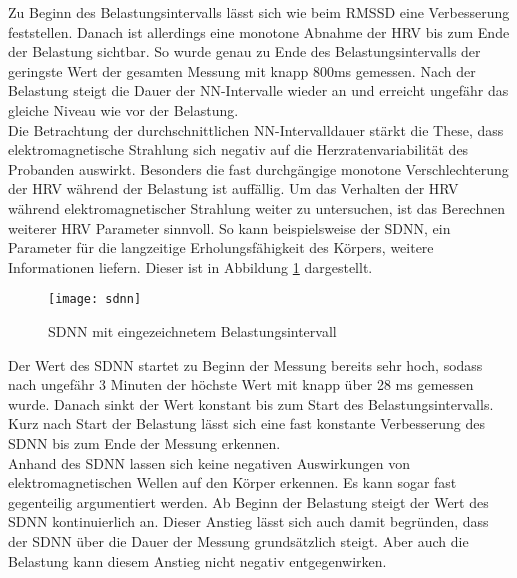 Zu Beginn des Belastungsintervalls lässt sich wie beim \acs{RMSSD} eine Verbesserung feststellen. Danach ist allerdings eine monotone Abnahme der \acs{HRV} bis zum Ende der Belastung sichtbar. So wurde genau zu Ende des Belastungsintervalls der geringste Wert der gesamten Messung mit knapp 800ms gemessen. Nach der Belastung steigt die Dauer der NN-Intervalle wieder an und erreicht ungefähr das gleiche Niveau wie vor der Belastung. \\
Die Betrachtung der durchschnittlichen NN-Intervalldauer stärkt die These, dass elektromagnetische Strahlung sich negativ auf die Herzratenvariabilität des Probanden auswirkt. Besonders die fast durchgängige monotone Verschlechterung der \acs{HRV} während der Belastung ist auffällig. Um das Verhalten der \acs{HRV} während elektromagnetischer Strahlung weiter zu untersuchen, ist das Berechnen weiterer \acs{HRV} Parameter sinnvoll. So kann beispielsweise der \acs{SDNN}, ein Parameter für die langzeitige Erholungsfähigkeit des Körpers, weitere Informationen liefern. Dieser ist in Abbildung \ref{fig:sdnn} dargestellt.
\begin{figure}[H]
	\centering
	\texttt{[image: sdnn]}
	\caption{SDNN mit eingezeichnetem Belastungsintervall}
	\label{fig:sdnn}
\end{figure}

Der Wert des \acs{SDNN} startet zu Beginn der Messung bereits sehr hoch, sodass nach ungefähr 3 Minuten der höchste Wert mit knapp über 28 ms gemessen wurde. Danach sinkt der Wert konstant bis zum Start des Belastungsintervalls. Kurz nach Start der Belastung lässt sich eine fast konstante Verbesserung des \acs{SDNN} bis zum Ende der Messung erkennen. \\
Anhand des \acs{SDNN} lassen sich keine negativen Auswirkungen von elektromagnetischen Wellen auf den Körper erkennen. Es kann sogar fast gegenteilig argumentiert werden. Ab Beginn der Belastung steigt der Wert des \acs{SDNN} kontinuierlich an. Dieser Anstieg lässt sich auch damit begründen, dass der \acs{SDNN} über die Dauer der Messung grundsätzlich steigt. Aber auch die Belastung kann diesem Anstieg nicht negativ entgegenwirken.  

